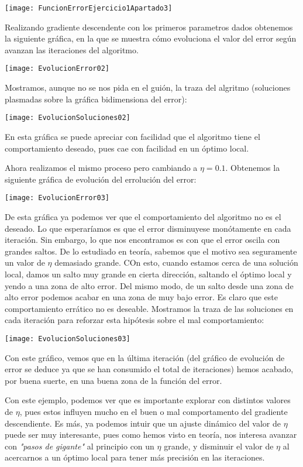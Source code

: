 \documentclass[11pt]{article}
\begin{document}
\texttt{[image: FuncionErrorEjercicio1Apartado3]}

Realizando gradiente descendente con los primeros parametros dados obtenemos la siguiente gráfica, en la que se muestra cómo evoluciona el valor del error según avanzan las iteraciones del algoritmo.

\texttt{[image: EvolucionError02]}

Mostramos, aunque no se nos pida en el guión, la traza del algritmo (soluciones plasmadas sobre la gráfica bidimensiona del error):

\texttt{[image: EvolucionSoluciones02]}

En esta gráfica se puede apreciar con facilidad que el algoritmo tiene el comportamiento deseado, pues cae con facilidad en un óptimo local.

Ahora realizamos el mismo proceso pero cambiando a $\eta = 0.1$. Obtenemos la siguiente gráfica de evolución del errolución del error:

\texttt{[image: EvolucionError03]}

De esta gráfica ya podemos ver que el comportamiento del algoritmo no es el deseado. Lo que esperaríamos es que el error disminuyese monótamente en cada iteración. Sin embargo, lo que nos encontramos es con que el error oscila con grandes saltos. De lo estudiado en teoría, sabemos que el motivo sea seguramente un valor de $\eta$ demasiado grande. COn esto, cuando estamos cerca de una solución local, damos un salto muy grande en cierta dirección, saltando el óptimo local y yendo a una zona de alto error. Del mismo modo, de un salto desde una zona de alto error podemos acabar en una zona de muy bajo error. Es claro que este comportamiento errático no es deseable. Mostramos la traza de las soluciones en cada iteración para reforzar esta hipótesis sobre el mal comportamiento:

\texttt{[image: EvolucionSoluciones03]}

Con este gráfico, vemos que en la última iteración (del gráfico de evolución de error se deduce ya que se han consumido el total de iteraciones) hemos acabado, por buena suerte, en una buena zona de la función del error.

Con este ejemplo, podemos ver que es importante explorar con distintos valores de $\eta$, pues estos influyen mucho en el buen o mal comportamento del gradiente descendiente. Es más, ya podemos intuir que un ajuste dinámico del valor de $\eta$ puede ser muy interesante, pues como hemos visto en teoría, nos interesa avanzar con \emph{"pasos de gigante"} al principio con un $\eta$ grande, y disminuir el valor de $\eta$ al acercarnos a un óptimo local para tener más precisión en las iteraciones.
\end{document}
